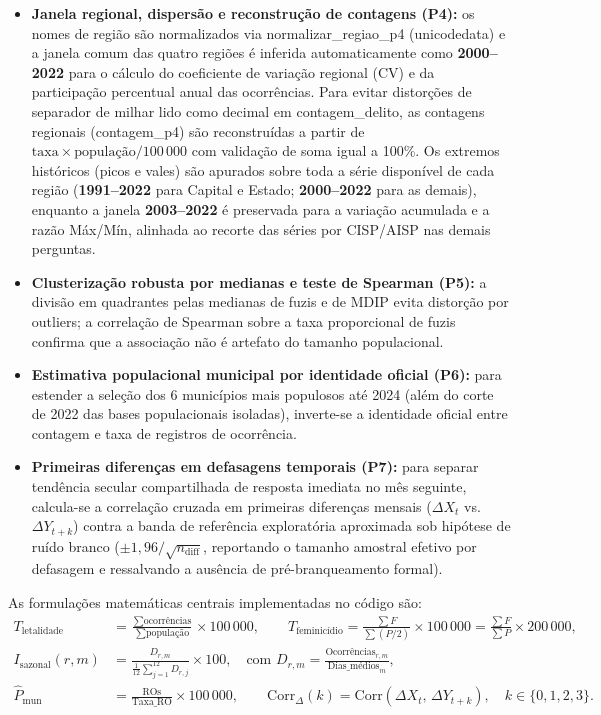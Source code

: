 \documentclass[11pt,a4paper]{article}
\newcommand{\code}[1]{{\ttfamily\footnotesize\allowbreak #1}}
\begin{document}
\begin{itemize}
  \item \textbf{Janela regional, dispersão e reconstrução de contagens (P4):} os nomes de região são normalizados via \code{normalizar\_regiao\_p4} (\code{unicodedata}) e a janela comum das quatro regiões é inferida automaticamente como \textbf{2000--2022} para o cálculo do coeficiente de variação regional (CV) e da participação percentual anual das ocorrências. Para evitar distorções de separador de milhar lido como decimal em \code{contagem\_delito}, as contagens regionais (\code{contagem\_p4}) são reconstruídas a partir de $\text{taxa} \times \text{população} / 100\,000$ com validação de soma igual a 100\%. Os extremos históricos (picos e vales) são apurados sobre toda a série disponível de cada região (\textbf{1991--2022} para Capital e Estado; \textbf{2000--2022} para as demais), enquanto a janela \textbf{2003--2022} é preservada para a variação acumulada e a razão Máx/Mín, alinhada ao recorte das séries por CISP/AISP nas demais perguntas.
  \item \textbf{Clusterização robusta por medianas e teste de Spearman (P5):} a divisão em quadrantes pelas medianas de fuzis e de MDIP evita distorção por outliers; a correlação de Spearman sobre a taxa proporcional de fuzis confirma que a associação não é artefato do tamanho populacional.
  \item \textbf{Estimativa populacional municipal por identidade oficial (P6):} para estender a seleção dos 6 municípios mais populosos até 2024 (além do corte de 2022 das bases populacionais isoladas), inverte-se a identidade oficial entre contagem e taxa de registros de ocorrência.
  \item \textbf{Primeiras diferenças em defasagens temporais (P7):} para separar tendência secular compartilhada de resposta imediata no mês seguinte, calcula-se a correlação cruzada em primeiras diferenças mensais ($\Delta X_t$ vs.\ $\Delta Y_{t+k}$) contra a banda de referência exploratória aproximada sob hipótese de ruído branco ($\pm 1{,}96 / \sqrt{n_{\text{diff}}}$, reportando o tamanho amostral efetivo por defasagem e ressalvando a ausência de pré-branqueamento formal).
\end{itemize}

As formulações matemáticas centrais implementadas no código são:
\begin{align}
  T_{\text{letalidade}} &= \frac{\sum \text{ocorrências}}{\sum \text{população}} \times 100\,000, \qquad
  T_{\text{feminicídio}} = \frac{\sum F}{\sum (P / 2)} \times 100\,000 = \frac{\sum F}{\sum P} \times 200\,000, \\[4pt]
  I_{\text{sazonal}}(r, m) &= \frac{D_{r,m}}{\frac{1}{12}\sum_{j=1}^{12} D_{r,j}} \times 100, \quad \text{com } D_{r,m} = \frac{\text{Ocorrências}_{r,m}}{\text{Dias\_médios}_m}, \\[4pt]
  \widehat{P}_{\text{mun}} &= \frac{\text{ROs}}{\text{Taxa\_RO}} \times 100\,000, \qquad
  \text{Corr}_{\Delta}(k) = \text{Corr}(\Delta X_t,\, \Delta Y_{t+k}), \quad k \in \{0,1,2,3\}.
\end{align}
\end{document}
